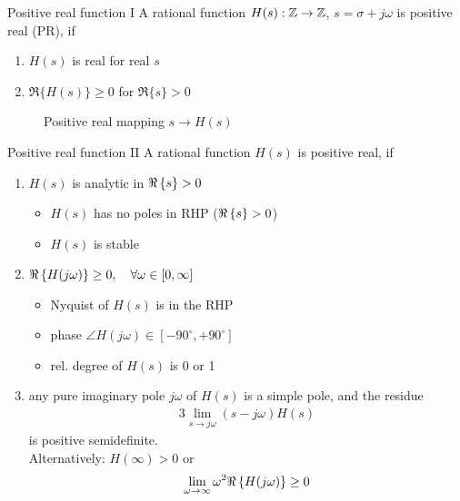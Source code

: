 \begin{definition}{Positive real function I}
A rational function $H(s): \mathbb{Z} \rightarrow \mathbb{Z}$, $s = \sigma + j\omega$ is
positive real (PR), if
\begin{enumerate}[label=(\roman*)]
\item {} $H(s)$ is real for real $s$ 
\item {} $\Re\{H(s)\} \geq 0$ for  $\Re\{s\} > 0$
\end{enumerate}

\begin{figure}[H]
    \centering
    \caption{Positive real mapping $s \rightarrow H(s)$}
    \label{fig:positive-real-mapping}
\end{figure}

\end{definition}

\begin{definition}{Positive real function II}
A rational function $H(s)$ is positive real, if
    \begin{enumerate}[label=(\roman*)]
    \item $H(s)$ is analytic
     in $\Re\left\{s\right\} >0$ 
        \begin{itemize}
        \item $H(s)$ has no poles in RHP ($\Re\left\{s\right\} > 0$)
        \item $H(s)$ is stable
        \end{itemize}
    \item $\Re\left\{H(j\omega)\right\} \geq 0, \quad \forall\omega \in [0, \infty]$    
        \begin{itemize}
            \item Nyquist of $H(s)$ is in the RHP
            \item phase $\angle H(j\omega) \in [-90^{\circ}, +90^{\circ}]$
            \item rel. degree of $H(s)$ is 0 or 1
        \end{itemize}
    \item any pure imaginary pole $j\omega$ of $H(s)$ is
        a simple pole, and the residue
    \begin{alignat*}{3}
    \lim_{s \rightarrow j\omega} \left( s - j\omega \right) H(s)
    \end{alignat*}
        is positive semidefinite.\\

        Alternatively: $H(\infty) > 0$ or 
    \begin{alignat*}{3}
        \lim_{\omega \rightarrow \infty} \omega^2 \Re\left\{H(j\omega)\right\} \geq 0
    \end{alignat*}
    \end{enumerate}
\end{definition}~


